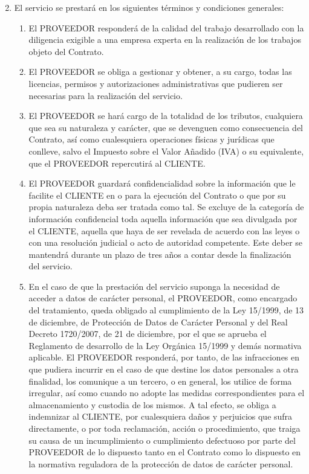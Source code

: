 \begin{description}[style=nextline]
\begin{enumerate}
  \setcounter{enumi}{1}
  \item El servicio se prestará en los siguientes términos y condiciones generales:
  \begin{enumerate}
    \item El PROVEEDOR responderá de la calidad del trabajo desarrollado con la diligencia exigible a una empresa experta en la realización de los trabajos objeto del Contrato.
    \item El PROVEEDOR se obliga a gestionar y obtener, a su cargo, todas las licencias, permisos y autorizaciones administrativas que pudieren ser necesarias para la realización del servicio.
    \item El PROVEEDOR se hará cargo de la totalidad de los tributos, cualquiera que sea su naturaleza y carácter, que se devenguen como consecuencia del Contrato, así como cualesquiera operaciones físicas y jurídicas que conlleve, salvo el Impuesto sobre el Valor Añadido (IVA) o su equivalente, que el PROVEEDOR repercutirá al CLIENTE.
    \item El PROVEEDOR guardará confidencialidad sobre la información que le facilite el CLIENTE en o para la ejecución del Contrato o que por su propia naturaleza deba ser tratada como tal. Se excluye de la categoría de información confidencial toda aquella información que sea divulgada por el CLIENTE, aquella que haya de ser revelada de acuerdo con las leyes o con una resolución judicial o acto de autoridad competente. Este deber se mantendrá durante un plazo de tres años a contar desde la finalización del servicio.
    \item En el caso de que la prestación del servicio suponga la necesidad de acceder a datos de carácter personal, el PROVEEDOR, como encargado del tratamiento, queda obligado al cumplimiento de la Ley 15/1999, de 13 de diciembre, de Protección de Datos de Carácter Personal y del Real Decreto 1720/2007, de 21 de diciembre, por el que se aprueba el Reglamento de desarrollo de la Ley Orgánica 15/1999 y demás normativa aplicable.
    El PROVEEDOR responderá, por tanto, de las infracciones en que pudiera incurrir en el caso de que destine los datos personales a otra finalidad, los comunique a un tercero, o en general, los utilice de forma irregular, así como cuando no adopte las medidas correspondientes para el almacenamiento y custodia de los mismos. A tal efecto, se obliga a indemnizar al CLIENTE, por cualesquiera daños y perjuicios que sufra directamente, o por toda reclamación, acción o procedimiento, que traiga su causa de un incumplimiento o cumplimiento defectuoso por parte del PROVEEDOR de lo dispuesto tanto en el Contrato como lo dispuesto en la normativa reguladora de la protección de datos de carácter personal.

\end{enumerate}
\end{enumerate}
\end{description}
